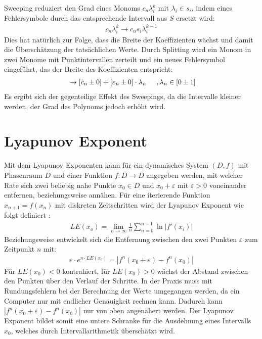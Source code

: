 Sweeping reduziert den Grad eines Monoms $c_n \lambda_i^k$ mit $\lambda_i \in s_i$, indem eines Fehlersymbole durch das entsprechende Intervall aus $S$ ersetzt wird: 
\begin{align*}
 c_n \lambda_i^k \rightarrow c_n s_i \lambda_i^{k-1}
\end{align*}
Dies hat natürlich zur Folge, dass die Breite der Koeffizienten wächst und damit die Überschätzung der tatsächlichen Werte. Durch Splitting wird ein Monom in zwei Monome mit Punktintervallen zerteilt und ein neues Fehlersymbol eingeführt, das der Breite des Koeffizienten entspricht:
\begin{align*}
 [\tilde{c}_n \pm \varepsilon_n]\ \rightarrow [\tilde{c}_n \pm 0] + [\varepsilon_n \pm 0]\cdot  \lambda_n \hspace{0.5cm}, \lambda_n \in [0 \pm 1]
\end{align*}
Es ergibt sich der gegenteilige Effekt des Sweepings, da die Intervalle kleiner werden, der Grad des Polynoms jedoch erhöht wird.





\section{Lyapunov Exponent}
Mit dem Lyapunov Exponenten kann für ein dynamisches System $(D,f)$ mit Phasenraum $D$ und einer Funktion $f: D \rightarrow D$ angegeben werden, mit welcher Rate sich zwei beliebig nahe Punkte $x_0 \in D$ und $x_0 + \varepsilon$ mit $\varepsilon > 0$ voneinander entfernen, beziehungsweise annähen. Für eine iterierende Funktion $x_{n+1} = f(x_n)$ mit diskreten Zeitschritten wird der Lyapunov Exponent wie folgt definiert \cite{Plaschko1989}:
\begin{align}
 LE(x_o) = \lim_{n \rightarrow \infty} \frac{1}{n} \sum_{n=0}^{n-1} \ln |f'(x_i)|
\end{align}
Beziehungsweise entwickelt sich die Entfernung zwischen den zwei Punkten $\varepsilon$ zum Zeitpunkt $n$ mit:
\begin{align}
 \varepsilon \cdot e^{n\cdot LE(x_0)} = |f^n(x_0 + \varepsilon) - f^n(x_0)|
\end{align}
Für $LE(x_0)<0$ kontrahiert, für $LE(x_0)>0$ wächst der Abstand zwischen den Punkten über den Verlauf der Schritte. In der Praxis muss mit Rundungsfehlern bei der Berechnung der Werte umgegangen werden, da ein Computer nur mit endlicher Genauigkeit rechnen kann. Dadurch kann $|f^n(x_0 + \varepsilon) - f^n(x_0)|$ nur von oben angenähert werden. Der Lyapunov Exponent bildet somit eine untere Schranke für die Ausdehnung eines Intervalls $x_0$, welches durch Intervallarithmetik überschätzt wird.




